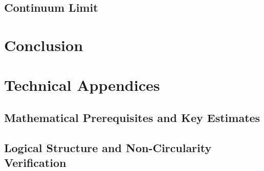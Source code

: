 \documentclass[11pt,a4paper]{report}
\begin{document}
\chapter{Continuum Limit}


\part{Conclusion}



\part{Technical Appendices}
\appendix

\chapter{Mathematical Prerequisites and Key Estimates}
\label{ch:math-prerequisites}




\chapter{Logical Structure and Non-Circularity Verification}
\label{ch:verification}




\end{document}
